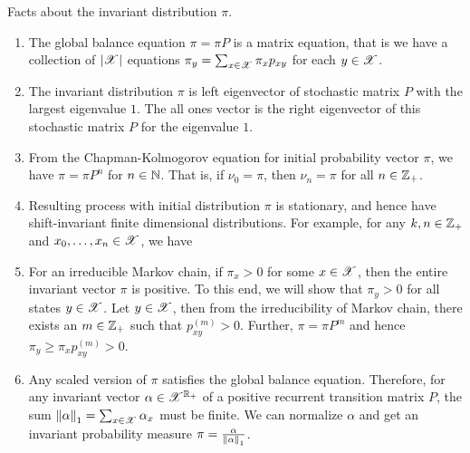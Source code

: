 \documentclass[letterpaper,10pt,english]{article}
\begin{document}
\begin{shaded*}
\begin{rem} 
Facts about the invariant distribution $\pi$. 
\begin{enumerate}[i\_]
\item The global balance equation $\pi = \pi P$ is a matrix equation, that is we have a collection of $\left\lvert\mathscr{X}\right\rvert$ equations $\pi_y = \sum_{x \in \mathscr{X}}\pi_xp_{xy}$ for each $y \in \mathscr{X}$. 
\item The invariant distribution $\pi$ is left eigenvector of stochastic matrix $P$ with the largest eigenvalue $1$. 
The all ones vector is the right eigenvector of this stochastic matrix $P$ for the eigenvalue $1$.  
\item From the Chapman-Kolmogorov equation for initial probability vector $\pi$, we have $\pi = \pi P^n$ for $n \in \mathbb{N}$. 
That is, if $\nu_0 = \pi$, then $\nu_n = \pi$ for all $n \in \mathbb{Z}_+$. 
\item Resulting process with initial distribution $\pi$ is stationary, and hence have shift-invariant finite dimensional distributions. 
For example, for any $k, n \in \mathbb{Z}_+$ and $x_0, \dots, x_n \in \mathscr{X}$, we have 
\item For an irreducible Markov chain, if $\pi_x > 0$ for some $x \in \mathscr{X}$, then the entire invariant vector $\pi$ is positive. 
To this end, we will show that $\pi_y > 0$ for all states $y \in \mathscr{X}$. 
Let $y \in \mathscr{X}$, then from the irreducibility of Markov chain, there exists an $m \in \mathbb{Z}_+$ such that $p_{xy}^{(m)} > 0$. 
Further, $\pi = \pi P^m$ and hence $\pi_y \ge \pi_x p_{xy}^{(m)} > 0$.  

\item Any scaled version of $\pi$ satisfies the global balance equation. 
Therefore, for any invariant vector $\alpha \in \mathscr{X}^{\mathbb{R}_+}$ of a positive recurrent transition matrix $P$,  
the sum $\left\lVert\alpha\right\rVert_1 = \sum_{x \in \mathscr{X}}\alpha_x$ must be finite. 
We can normalize $\alpha$ and get an invariant probability measure $\pi = \frac{\alpha}{\left\lVert\alpha\right\rVert_1}$. 
\end{enumerate}
\end{rem}
\end{shaded*}
\end{document}
